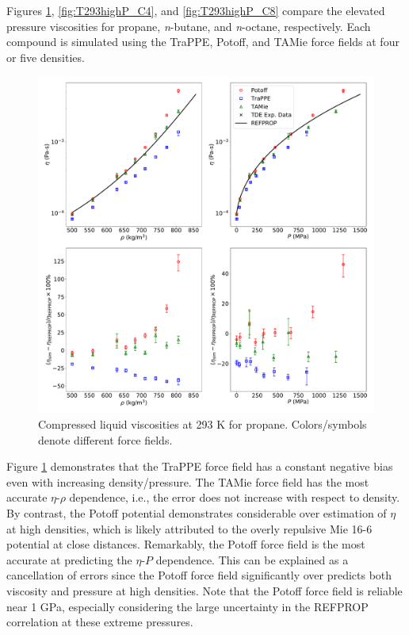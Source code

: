 \documentclass[preprint,review,12pt]{elsarticle}
\begin{document}
	Figures \ref{fig:T293highP_C3}, \ref{fig:T293highP_C4}, and \ref{fig:T293highP_C8} compare the elevated pressure viscosities for propane, \textit{n}-butane, and \textit{n}-octane, respectively. Each compound is simulated using the TraPPE, Potoff, and TAMie force fields at four or five densities.
	
	
	
	\begin{figure}[htb!]
		\centering
		\includegraphics[width=6.4in]{compare_REFPROP_T293highP_C3H8_Pas.pdf}
		\caption{Compressed liquid viscosities at 293 K for propane. Colors/symbols denote different force fields.}
		\label{fig:T293highP_C3}
	\end{figure} 
	
	Figure \ref{fig:T293highP_C3} demonstrates that the TraPPE force field has a constant negative bias even with increasing density/pressure. The TAMie force field has the most accurate $\eta$-$\rho$ dependence, i.e., the error does not increase with respect to density. By contrast, the Potoff potential demonstrates considerable over estimation of $\eta$ at high densities, which is likely attributed to the overly repulsive Mie 16-6 potential at close distances. Remarkably, the Potoff force field is the most accurate at predicting the $\eta$-$P$ dependence. This can be explained as a cancellation of errors since the Potoff force field significantly over predicts both viscosity and pressure at high densities. Note that the Potoff force field is reliable near 1 GPa, especially considering the large uncertainty in the REFPROP correlation at these extreme pressures.
	
\end{document}
